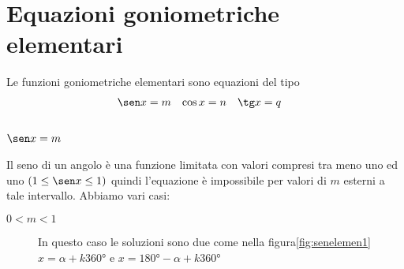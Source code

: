 %
\section{Equazioni goniometriche elementari}
\label{sec:EquazioniGoniometricheElementari}
Le funzioni goniometriche elementari sono equazioni del tipo
\begin{align*}
	\sen x&=m&\cos x&=n&\tg x&=q
\end{align*}
\subsection{$\sen x=m$}
Il seno di un angolo è una funzione limitata con valori compresi tra meno uno ed uno $(1\leq\sen x\leq 1)$ quindi l'equazione è impossibile per valori di $m$ esterni a tale intervallo. Abbiamo vari casi:
\begin{description}
	\item[$0<m<1$] In questo caso le soluzioni sono due come nella figura\nobs\vref{fig:senelemen1} $x=\alpha+k\ang{360}$ e $x=\ang{180}-\alpha+k\ang{360}$
\end{description} 


